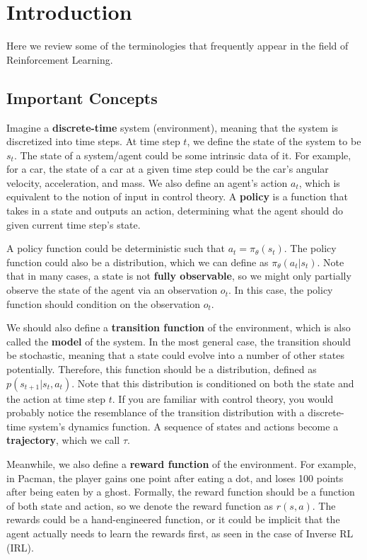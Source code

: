 \chapter{Introduction}

Here we review some of the terminologies that frequently appear in the field of Reinforcement Learning.
\section{Important Concepts}
Imagine a \textbf{discrete-time} system (environment), meaning that the system is discretized into time steps. At time step $t$, we define the state of the system to be $s_t$. The state of a system/agent could be some intrinsic data of it. For example, for a car, the state of a car at a given time step could be the car's angular velocity, acceleration, and mass. We also define an agent's action $a_t$, which is equivalent to the notion of input in control theory. A \textbf{policy} is a function that takes in a state and outputs an action, determining what the agent should do given current time step's state. 

A policy function could be deterministic such that $a_t = \pi_\theta(s_t)$. The policy function could also be a distribution, which we can define as $\pi_\theta(a_t|s_t)$. Note that in many cases, a state is not \textbf{fully observable}, so we might only partially observe the state of the agent via an observation $o_t$. In this case, the policy function should condition on the observation $o_t$. 

We should also define a \textbf{transition function} of the environment, which is also called the \textbf{model} of the system. In the most general case, the transition should be stochastic, meaning that a state could evolve into a number of other states potentially. Therefore, this function should be a distribution, defined as $p(s_{t+1}|s_t, a_t)$. Note that this distribution is conditioned on both the state and the action at time step $t$. If you are familiar with control theory, you would probably notice the resemblance of the transition distribution with a discrete-time system's dynamics function. A sequence of states and actions become a \textbf{trajectory}, which we call $\tau$.

Meanwhile, we also define a \textbf{reward function} of the environment. For example, in Pacman, the player gains one point after eating a dot, and loses 100 points after being eaten by a ghost. Formally, the reward function should be a function of both state and action, so we denote the reward function as $r(s,a)$. The rewards could be a hand-engineered function, or it could be implicit that the agent actually needs to learn the rewards first, as seen in the case of Inverse RL (IRL).

